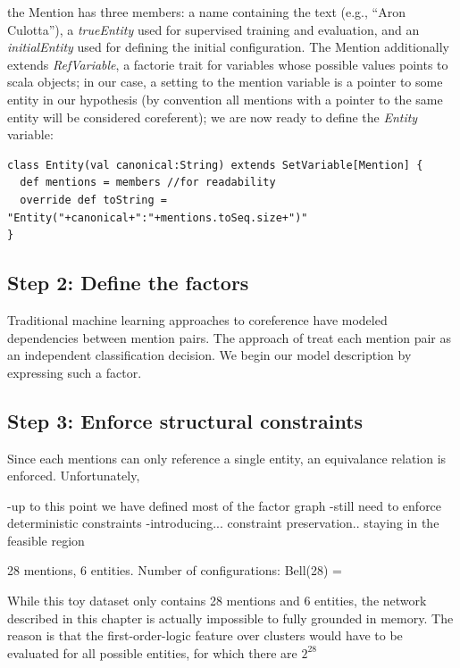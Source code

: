 \documentclass[]{manual}
\begin{document}
\noindent the Mention has three members: a name containing the text
(e.g., ``Aron Culotta''), a {\em trueEntity} used for supervised
training and evaluation, and an {\em initialEntity} used for defining
the initial configuration. The Mention additionally extends {\em
  RefVariable}, a factorie trait for variables whose possible values
points to scala objects; in our case, a setting to the mention
variable is a pointer to some entity in our hypothesis (by convention
all mentions with a pointer to the same entity will be considered
coreferent); we are now ready to define the {\em Entity} variable:

\begin{lstlisting}
class Entity(val canonical:String) extends SetVariable[Mention] {
  def mentions = members //for readability
  override def toString = "Entity("+canonical+":"+mentions.toSeq.size+")"
}
\end{lstlisting}

\subsection{Step 2: Define the factors}

Traditional machine learning approaches to coreference have modeled
dependencies between mention pairs. The approach of
\citep{soon01machine} treat each mention pair as an independent
classification decision. We begin our model description by expressing such a
factor.




\subsection{Step 3: Enforce structural constraints}
Since each mentions can only reference a single entity, an equivalance relation is enforced. Unfortunately, 


-up to this point we have defined most of the factor graph
-still need to enforce deterministic constraints
-introducing... constraint preservation.. staying in the feasible region



28 mentions, 6 entities. Number of configurations: Bell(28) = 

While this toy dataset only contains 28 mentions and 6 entities, the
network described in this chapter is actually impossible to fully
grounded in memory. The reason is that the first-order-logic feature over clusters would have to be evaluated for all possible entities, for which there are $2^{28}$
\end{document}
